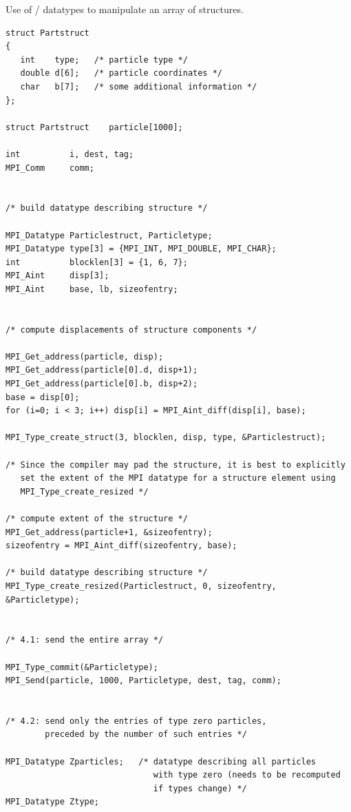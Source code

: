 \begin{example}
\label{pt2pt-exGG}
%
%
Use of \MPI/ datatypes to manipulate an array of structures.

\begin{lstlisting}[language={[MPI]C}]
struct Partstruct
{
   int    type;   /* particle type */
   double d[6];   /* particle coordinates */
   char   b[7];   /* some additional information */
};

struct Partstruct    particle[1000];

int          i, dest, tag;
MPI_Comm     comm;


/* build datatype describing structure */

MPI_Datatype Particlestruct, Particletype;
MPI_Datatype type[3] = {MPI_INT, MPI_DOUBLE, MPI_CHAR};
int          blocklen[3] = {1, 6, 7};
MPI_Aint     disp[3];
MPI_Aint     base, lb, sizeofentry;


/* compute displacements of structure components */

MPI_Get_address(particle, disp);
MPI_Get_address(particle[0].d, disp+1);
MPI_Get_address(particle[0].b, disp+2);
base = disp[0];
for (i=0; i < 3; i++) disp[i] = MPI_Aint_diff(disp[i], base);

MPI_Type_create_struct(3, blocklen, disp, type, &Particlestruct);

/* Since the compiler may pad the structure, it is best to explicitly
   set the extent of the MPI datatype for a structure element using
   MPI_Type_create_resized */

/* compute extent of the structure */
MPI_Get_address(particle+1, &sizeofentry);
sizeofentry = MPI_Aint_diff(sizeofentry, base);

/* build datatype describing structure */
MPI_Type_create_resized(Particlestruct, 0, sizeofentry, &Particletype);


/* 4.1: send the entire array */

MPI_Type_commit(&Particletype);
MPI_Send(particle, 1000, Particletype, dest, tag, comm);


/* 4.2: send only the entries of type zero particles,
        preceded by the number of such entries */

MPI_Datatype Zparticles;   /* datatype describing all particles
                              with type zero (needs to be recomputed
                              if types change) */
MPI_Datatype Ztype;


\end{lstlisting}
\end{example}
